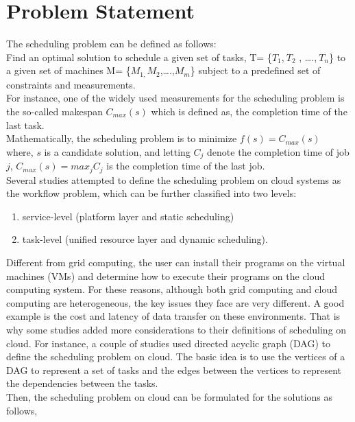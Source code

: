 \chapter{Problem Statement}
\pagestyle{fancy}
\fancyhead[LO]{\itshape\nouppercase{\rightmark}}



The scheduling problem can be defined as follows:\\
\hspace{0.2in}Find an optimal solution to schedule a given set of tasks,  T= \{$T_1$,$\ T_2$ , \ldots{}.,$\ T_n$\} to a given
set of machines  M= \{$M_{1,}M_2$,\ldots{}.,$M_m$\}  subject to a predefined set of constraints and measurements.\\
For instance, one of the widely used measurements for the scheduling problem is the so-called  makespan $C_{max}(s) $ which is defined as, the completion time of the last task.\\
Mathematically, the scheduling problem is to minimize	$ f(s)=C_{max}(s) $\\
where, $s$ is a candidate solution, and letting $C_j$ denote the completion time of job $j$,
$ C_{max}(s)=max_j C_j $ is the completion time of the last job.\\
\hspace{0.2in}Several studies attempted to define the scheduling problem on cloud systems as the workflow problem, which can be further classified into two levels:
\begin{enumerate}
	\item service-level (platform layer and static scheduling)
	\item task-level (unified resource layer and dynamic scheduling).
\end{enumerate}

\hspace{0.2in} Different from grid computing, the user can install their programs on the virtual machines (VMs) and determine how to execute their programs on the cloud computing system. For these reasons, although both grid computing and cloud computing are heterogeneous, the key issues they face are very different. A good example is the cost and latency of data transfer on these environments. That is why some studies added more considerations to their definitions of scheduling on cloud. For instance, a couple of studies used directed acyclic graph (DAG) to define the scheduling problem on cloud. The basic idea is to use the vertices of a DAG to represent a set of tasks and the edges between the vertices to represent the dependencies between the tasks.\\
 Then, the scheduling problem on cloud can be formulated for the solutions as follows,

